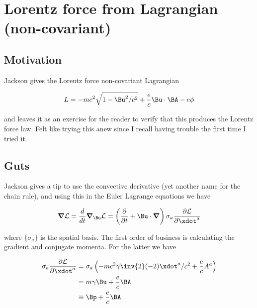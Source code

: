 

\chapter{Lorentz force from Lagrangian (non-covariant)}
\label{chap:jackson12Dash9}
{}
\date{Sept 22, 2009}

\beginArtNoToc

\section{Motivation}

Jackson \cite{jackson1975cew} gives the Lorentz force non-covariant Lagrangian 

\begin{align}\label{eqn:jacksonLorLag:foo1}
L = - m c^2 \sqrt{1 -\Bu^2/c^2} + \frac{e}{c} \Bu \cdot \BA - e \phi
\end{align}

and leaves it as an exercise for the reader to verify that this produces the Lorentz force law.  Felt like trying this anew since I recall having trouble the first time I tried it.

\section{Guts}

Jackson gives a tip to use the convective derivative (yet another name for the chain rule), and using this in the Euler Lagrange equations we have

\begin{align}\label{eqn:jacksonLorLag:foo2}
\spacegrad \LL = \frac{d}{dt} \spacegrad_\Bu \LL = \left( \frac{\partial}{\partial t} + \Bu \cdot \spacegrad \right) \sigma_a \frac{\partial \LL}{\partial \xdot^a}
\end{align}

where $\{\sigma_a\}$ is the spatial basis.  The first order of business is calculating the gradient and conjugate momenta.  For the latter we have

\begin{align*}
\sigma_a \frac{\partial \LL}{\partial \xdot^a}
&=
\sigma_a \left(- m c^2 \gamma \inv{2} (-2) \xdot^a/c^2 + \frac{e}{c} A^a \right) \\
&=
m \gamma \Bu + \frac{e}{c} \BA \\
&\equiv \Bp + \frac{e}{c}\BA
\end{align*}

